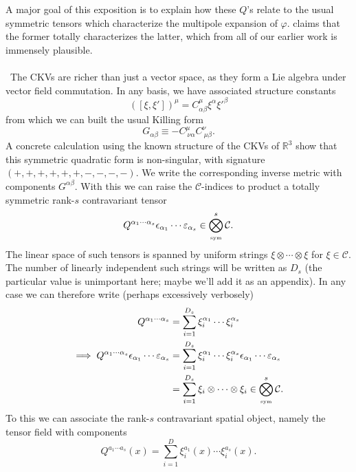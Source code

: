 \documentclass[11pt,letterpaper]{article}
\newcommand{\mc}[1]{\mathcal{#1}}
\newcommand{\R}{\mathbb{R}}
\begin{document}
A major goal of this exposition is to explain how these $Q$'s relate to the usual symmetric tensors which characterize the multipole expansion of $\varphi$. \cite{Geroch:1970cc} claims that the former totally characterizes the latter, which from all of our earlier work is immensely plausible.\\
\\
\
The CKVs are richer than just a vector space, as they form a Lie algebra under vector field commutation. In any basis, we have associated structure constants \begin{equation}
([\xi, \xi'])^\mu = C^\mu_{\alpha \beta} \xi^\alpha {\xi'}^\beta
\end{equation}
from which we can built the usual Killing form \begin{equation}\label{killingform}
G_{\alpha \beta} \equiv - C^\mu _{\ \nu \alpha} C^\nu _{ \ \mu \beta}.
\end{equation}
A concrete calculation using the known structure of the CKVs of $\R^3$ show that this symmetric quadratic form is non-singular, with signature $(+,+,+,+,+,+,-,-,-,-)$. We write the corresponding inverse metric with components $G^{\alpha \beta}$. With this we can raise the $\mc{C}$-indices to product a totally symmetric rank-$s$ contravariant tensor \begin{equation}
Q^{\alpha_1 \cdots \alpha_s} \epsilon_{\alpha_1} \cdots \varepsilon_{\alpha_s} \in \bigotimes^s_{\mbox{\tiny{sym}}} \mc{C}.
\end{equation}
The linear space of such tensors is spanned by uniform strings $\xi \otimes \cdots \otimes \xi$ for $\xi \in \mc{C}$. The number of linearly independent such strings will be written as $D_s$ (the particular value is unimportant here; maybe we'll add it as an appendix). In any case we can therefore write (perhaps excessively verbosely) \begin{equation}
\begin{aligned}
Q^{\alpha_1 \cdots \alpha_s} & = \sum_{i=1}^{D_s} \xi_i^{\alpha_1} \cdots \xi_i^{\alpha_s} \\
\implies Q^{\alpha_1 \cdots \alpha_s} \epsilon_{\alpha_1} \cdots \varepsilon_{\alpha_s} & = \sum_{i=1}^{D_s} \xi_i^{\alpha_1} \cdots \xi_i^{\alpha_s} \epsilon_{\alpha_1} \cdots \varepsilon_{\alpha_s} \\
& = \sum_{i=1}^{D_s} \xi_i \otimes \cdots \otimes \xi_i \in \bigotimes^s_{\mbox{\tiny{sym}}} \mc{C}.
\end{aligned}
\end{equation}
To this we can associate the rank-$s$ contravariant spatial object, namely the tensor field with components \begin{equation}
Q^{a_1 \cdots a_s}(x) = \sum_{i = 1}^D \xi_i^{a_1} (x) \cdots \xi_i^{a_s} (x).
\end{equation}
\end{document}
